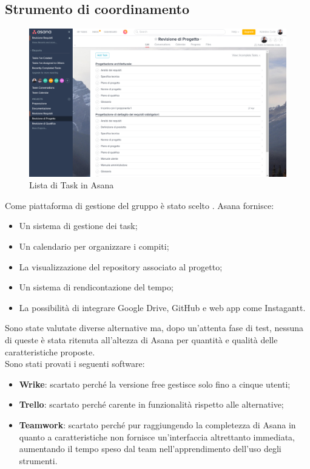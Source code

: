 \documentclass[../NormeDiProgetto.tex]{subfiles}
\begin{document}
				\subsection{Strumento di coordinamento}
				\begin{figure} [h!]
					\centering
					\includegraphics[scale=0.2]{./Immagini/Asana.png}
					\caption{Lista di Task in Asana}\label{}
				\end{figure}
				Come piattaforma di gestione del gruppo è stato scelto . Asana fornisce:
				\begin{itemize}
					\item Un sistema di gestione dei task;
					\item Un calendario per organizzare i compiti;
					\item La visualizzazione del repository associato al progetto;
					\item Un sistema di rendicontazione del tempo;
					\item La possibilità di integrare Google Drive, GitHub e web app come Instagantt.
				\end{itemize}
				Sono state valutate diverse alternative ma, dopo un'attenta fase di test, nessuna di queste è
				stata ritenuta all'altezza di Asana per quantità e qualità delle caratteristiche proposte.\\
				Sono stati provati i seguenti software:
				\begin{itemize}
					\item \textbf{Wrike}: scartato perché la versione free gestisce solo fino a cinque utenti;
					\item \textbf{Trello}: scartato perché carente in funzionalità rispetto alle alternative;  
					\item \textbf{Teamwork}: scartato perché pur raggiungendo la completezza di Asana in quanto
					a caratteristiche non fornisce un'interfaccia altrettanto immediata, aumentando il tempo
					speso dal team nell'apprendimento dell'uso degli strumenti.
				\end{itemize}
\end{document}
